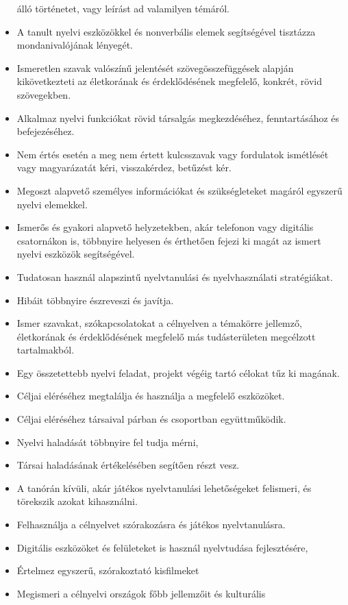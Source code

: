 \begin{itemize}
  álló történetet, vagy leírást ad valamilyen témáról.
\item
  A tanult nyelvi eszközökkel és nonverbális elemek segítségével
  tisztázza mondanivalójának lényegét.
\item
  Ismeretlen szavak valószínű jelentését szövegösszefüggések alapján
  kikövetkezteti az életkorának és érdeklődésének megfelelő, konkrét,
  rövid szövegekben.
\item
  Alkalmaz nyelvi funkciókat rövid társalgás megkezdéséhez,
  fenntartásához és befejezéséhez.
\item
  Nem értés esetén a meg nem értett kulcsszavak vagy fordulatok
  ismétlését vagy magyarázatát kéri, visszakérdez, betűzést kér.
\item
  Megoszt alapvető személyes információkat és szükségleteket magáról
  egyszerű nyelvi elemekkel.
\item
  Ismerős és gyakori alapvető helyzetekben, akár telefonon vagy
  digitális csatornákon is, többnyire helyesen és érthetően fejezi ki
  magát az ismert nyelvi eszközök segítségével.
\item
  Tudatosan használ alapszintű nyelvtanulási és nyelvhasználati
  stratégiákat.
\item
  Hibáit többnyire észreveszi és javítja.
\item
  Ismer szavakat, szókapcsolatokat a célnyelven a témakörre jellemző,
  életkorának és érdeklődésének megfelelő más tudásterületen megcélzott
  tartalmakból.
\item
  Egy összetettebb nyelvi feladat, projekt végéig tartó célokat tűz ki
  magának.
\item
  Céljai eléréséhez megtalálja és használja a megfelelő eszközöket.
\item
  Céljai eléréséhez társaival párban és csoportban együttműködik.
\item
  Nyelvi haladását többnyire fel tudja mérni,
\item
  Társai haladásának értékelésében segítően részt vesz.
\item
  A tanórán kívüli, akár játékos nyelvtanulási lehetőségeket felismeri,
  és törekszik azokat kihasználni.
\item
  Felhasználja a célnyelvet szórakozásra és játékos nyelvtanulásra.
\item
  Digitális eszközöket és felületeket is használ nyelvtudása
  fejlesztésére,
\item
  Értelmez egyszerű, szórakoztató kisfilmeket
\item
  Megismeri a célnyelvi országok főbb jellemzőit és kulturális

\end{itemize}
